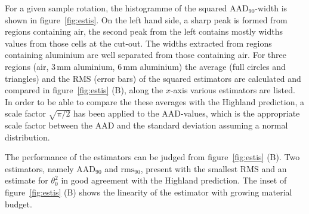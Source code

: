 \documentclass{PoS}
\newcommand{\rmsninety}{\ensuremath{\textrm{rms}_\textrm{90}}}
\newcommand{\aadninety}{\ensuremath{\textrm{AAD}_\textrm{90}}}
\begin{document}
%

For a given sample rotation, the histogramme of the squared $\aadninety$-width is shown in figure~\ref{fig:estis}.
On the left hand side, a sharp peak is formed from regions containing air, the second peak from the left contains mostly widths values from those cells at the cut-out.
The widths extracted from regions containing aluminium are well separated from those containing air. 
For three regions (air, 3\,mm aluminium, 6\,mm aluminium) the average (full circles and triangles) and the RMS (error bars) of the squared estimators are calculated and compared in figure~\ref{fig:estis} (B), 
 along the $x$-axis various estimators are listed. 
In order to be able to compare the these averages with the Highland prediction, a scale factor $\sqrt{\pi/2}$
 has been applied to the AAD-values, which is the appropriate scale factor between the AAD and the standard deviation assuming a normal distribution. 

The performance of the estimators can be judged from figure~\ref{fig:estis} (B).
Two estimators, namely $\aadninety$ and $\rmsninety$, present with the smallest RMS and an estimate for $\theta_0^2$ in good agreement with the Highland prediction. 
The inset of figure~\ref{fig:estis} (B) shows the linearity of the estimator with growing material budget. 
\end{document}
